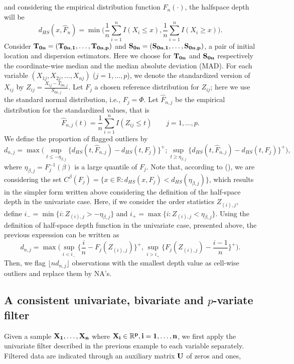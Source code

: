 \documentclass[a4paper,12pt]{article}
\begin{document}
and considering the empirical distribution function $\hat{F}_n(\cdot)$, the halfspace depth will be 
\begin{equation*}
d_{HS}(x,\hat{F}_n) = \min \biggl( \frac{1}{n} \sum_{i=1}^n I(X_i \leq x) , \frac{1}{n} \sum_{i=1}^n I(X_i \geq x) \biggr). 
\end{equation*}
Consider $\bf{T}_{0n} = (T_{0n,1}, \ldots, T_{0n,p})$ and $\bf{S}_{0n} = (S_{0n,1}, \ldots, S_{0n,p})$, a pair of initial location and dispersion estimators. Here we choose for  $\bf{T}_{0n}$ and $\bf{S}_{0n}$ respectively the coordinate-wise median and the median absolute deviation (MAD).
For each variable $(X_{1j}, X_{2j}, \ldots, X_{nj})$ ($j=1, \ldots, p$), we denote the standardized version of $X_{ij}$ by $Z_{ij}= \frac{X_{ij} - T_{0n,j}}{S_{0n,j}}$. Let $F_j$ a chosen reference distribution for $Z_{ij}$; here we use the standard normal distribution, i.e., $F_j = \Phi$.
Let $\hat{F}_{n,j}$ be the empirical distribution for the standardized values, that is
\begin{equation*}
\hat{F}_{n,j}(t) = \frac{1}{n} \sum_{i=1}^{n} I(Z_{ij} \leq t) \qquad j = 1, \ldots, p.
\end{equation*}
We define the proportion of flagged outliers by
\small
\begin{equation*}
d_{n,j} = \max \biggl( \sup_{t \leq -\eta_{\beta,j}} \{d_{HS}(t,\hat{F}_{n,j}) - d_{HS}(t, F_j)\}^+ ; \sup_{t \geq \eta_{\beta,j}} \{d_{HS}(t,\hat{F}_{n,j}) - d_{HS}(t, F_j)\}^+ \biggr),
\end{equation*}
\normalsize
where $\eta_{\beta,j} = F_j^{-1}(\beta)$ is a large quantile of $F_j$. Note that, according to (), we are considering the set $C^\beta(F_j) = \{x \in \mathbb{R} : d_{HS}(x,F_j) < d_{HS}(\eta_{\beta,j})\}$, which results in the simpler form written above considering the definition of the half-space depth in the univariate case.
Here, if we consider the order statistics $Z_{(i),j}$, define $i_- = \min \{ i : Z_{(i),j} > -\eta_{\beta,j} \}$  and $i_+ = \max \{ i : Z_{(i),j} < \eta_{\beta,j} \}$. Using the definition of half-space depth function in the univariate case, presented above, the previous expression can be written as 
\begin{equation}
d_{n,j} = \max \biggl( \sup_{i < i_-} \{\frac{i}{n} -  F_j(Z_{(i),j})\}^+ , \sup_{i > i_+} \{ F_j(Z_{(i),j}) - \frac{i-1}{n}\}^+ \biggr).
\end{equation}
Then, we flag $\lfloor nd_{n,j} \rfloor$ observations with the smallest depth value as cell-wise outliers and replace them by NA's.
\subsection{A consistent univariate, bivariate and $p$-variate filter}
Given a sample $\bf{X}_1, \ldots, \bf{X}_n$ where $\bf{X}_i \in \mathbb{R}^p, i = 1, \ldots, n$, we first apply the univariate filter described in the previous example to each variable separately. Filtered data are indicated through an auxiliary matrix $\bf{U}$ of zeros and ones,
\end{document}
